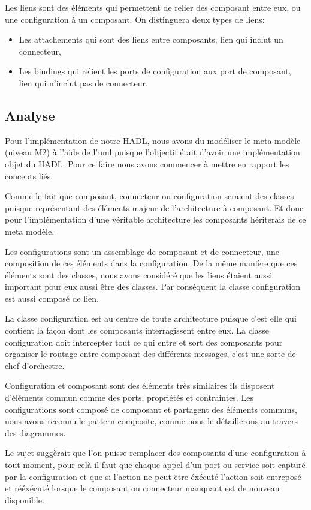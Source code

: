 \documentclass[11pt,a4paper]{article}
\begin{document}
Les liens sont des éléments qui permettent de relier des composant entre eux, ou
une configuration à un composant. On distinguera deux types de liens:
\begin{itemize}
  \item Les attachements qui sont des liens entre composants, lien qui inclut un
connecteur,
  \item Les bindings qui relient les ports de configuration aux port de
  composant, lien qui n'inclut pas de connecteur.
\end{itemize}
 
\subsection{Analyse}

Pour l'implémentation de notre HADL, nous avons du modéliser le meta modèle (niveau M2) à l'aide de l'uml puisque l'objectif était d'avoir une implémentation objet du HADL. Pour ce faire nous avons commencer à mettre en rapport les concepts liés.

Comme le fait que composant, connecteur ou configuration seraient des classes puisque représentant des éléments majeur de l'architecture à composant. Et donc pour l'implémentation d'une véritable architecture les composants hériterais de ce meta modèle.

Les configurations sont un assemblage de composant et de connecteur, une composition de ces éléments dans la configuration. De la même manière que ces éléments sont des classes, nous avons considéré que les liens étaient aussi important pour eux aussi être des classes. Par conséquent la classe configuration est aussi composé de lien.

La classe configuration est au centre de toute architecture puisque c'est elle qui contient la façon dont les composants interragissent entre eux. La classe configuration doit intercepter tout ce qui entre et sort des composants pour organiser le routage entre composant des différents messages, c'est une sorte de chef d'orchestre. 

Configuration et composant sont des éléments très similaires ils disposent d'éléments commun comme des ports, propriétés et contraintes. Les configurations sont composé de composant et partagent des éléments communs, nous avons reconnu le pattern composite, comme nous le détaillerons au travers des diagrammes.

Le sujet suggèrait que l'on puisse remplacer des composants d'une configuration à tout moment, pour celà il faut que chaque appel d'un port ou service soit capturé par la configuration et que si l'action ne peut être éxécuté l'action soit entreposé et rééxécuté lorsque le composant ou connecteur manquant est de nouveau disponible.
\end{document}
